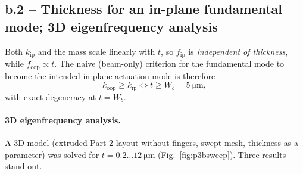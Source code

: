 \subsection*{b.2 -- Thickness for an in-plane fundamental mode; 3D eigenfrequency analysis}

Both $k_{\mathrm{ip}}$ and the mass scale linearly with $t$, so
$f_{\mathrm{ip}}$ is \emph{independent of thickness}, while
$f_{\mathrm{oop}}\propto t$. The naive (beam-only) criterion for the
fundamental mode to become the intended in-plane actuation mode is therefore
\begin{equation}
  k_{\mathrm{oop}}\ge k_{\mathrm{ip}}
  \iff
  t \ge W_{b} = \SI{5}{\micro\meter},
  \label{eq:naivecross}
\end{equation}
with exact degeneracy at $t=W_{b}$.

\paragraph{3D eigenfrequency analysis.} A 3D model (extruded Part-2 layout
without fingers, swept mesh, thickness as a parameter) was solved for
$t=0.2\dots\SI{12}{\micro\meter}$ (Fig.~\ref{fig:p3bsweep}). Three results
stand out.

